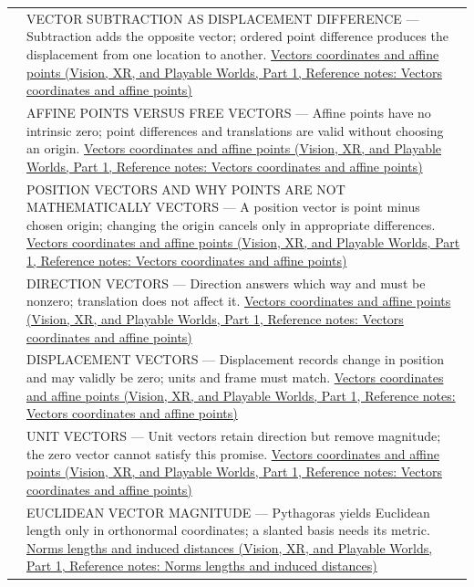 {\begin{longtable}[]{@{}
  >{\raggedright\arraybackslash}p{}
  >{\raggedright\arraybackslash}p{}@{}}
520 & VECTOR SUBTRACTION AS DISPLACEMENT DIFFERENCE --- Subtraction adds the opposite vector; ordered point difference produces the displacement from one location to another. \href{../07-Vision-XR-and-Playable-Worlds-P01/main.pdf\#nameddest=appendix-0659864c0aa3}{Vectors coordinates and affine points (Vision, XR, and Playable Worlds, Part 1, Reference notes: Vectors coordinates and affine points)} \\
521 & AFFINE POINTS VERSUS FREE VECTORS --- Affine points have no intrinsic zero; point differences and translations are valid without choosing an origin. \href{../07-Vision-XR-and-Playable-Worlds-P01/main.pdf\#nameddest=appendix-0659864c0aa3}{Vectors coordinates and affine points (Vision, XR, and Playable Worlds, Part 1, Reference notes: Vectors coordinates and affine points)} \\
522 & POSITION VECTORS AND WHY POINTS ARE NOT MATHEMATICALLY VECTORS --- A position vector is point minus chosen origin; changing the origin cancels only in appropriate differences. \href{../07-Vision-XR-and-Playable-Worlds-P01/main.pdf\#nameddest=appendix-0659864c0aa3}{Vectors coordinates and affine points (Vision, XR, and Playable Worlds, Part 1, Reference notes: Vectors coordinates and affine points)} \\
523 & DIRECTION VECTORS --- Direction answers which way and must be nonzero; translation does not affect it. \href{../07-Vision-XR-and-Playable-Worlds-P01/main.pdf\#nameddest=appendix-0659864c0aa3}{Vectors coordinates and affine points (Vision, XR, and Playable Worlds, Part 1, Reference notes: Vectors coordinates and affine points)} \\
524 & DISPLACEMENT VECTORS --- Displacement records change in position and may validly be zero; units and frame must match. \href{../07-Vision-XR-and-Playable-Worlds-P01/main.pdf\#nameddest=appendix-0659864c0aa3}{Vectors coordinates and affine points (Vision, XR, and Playable Worlds, Part 1, Reference notes: Vectors coordinates and affine points)} \\
525 & UNIT VECTORS --- Unit vectors retain direction but remove magnitude; the zero vector cannot satisfy this promise. \href{../07-Vision-XR-and-Playable-Worlds-P01/main.pdf\#nameddest=appendix-0659864c0aa3}{Vectors coordinates and affine points (Vision, XR, and Playable Worlds, Part 1, Reference notes: Vectors coordinates and affine points)} \\
526 & EUCLIDEAN VECTOR MAGNITUDE --- Pythagoras yields Euclidean length only in orthonormal coordinates; a slanted basis needs its metric. \href{../07-Vision-XR-and-Playable-Worlds-P01/main.pdf\#nameddest=appendix-49933872bb51}{Norms lengths and induced distances (Vision, XR, and Playable Worlds, Part 1, Reference notes: Norms lengths and induced distances)} \\

\end{longtable}}
